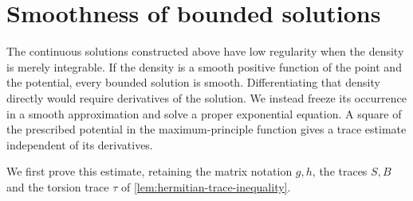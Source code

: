 \section{Smoothness of bounded solutions}
\label{sec:bounded-hermitian-smoothness}

The continuous solutions constructed above have low regularity when the density is merely integrable. If the density is a smooth positive function of the point and the potential, every bounded solution is smooth. Differentiating that density directly would require derivatives of the solution. We instead freeze its occurrence in a smooth approximation and solve a proper exponential equation. A square of the prescribed potential in the maximum-principle function gives a trace estimate independent of its derivatives.

We first prove this estimate, retaining the matrix notation $g,h$, the traces $S,B$ and the torsion trace $\tau$ of \cref{lem:hermitian-trace-inequality}.

